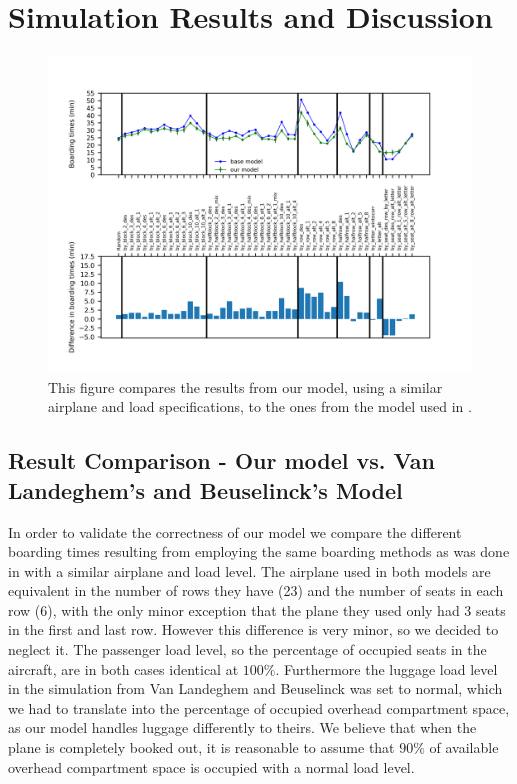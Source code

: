 \documentclass[11pt]{article}
\begin{document}
\section{Simulation Results and Discussion}
\begin{figure}
	\includegraphics[width=\linewidth]{../../code/AirplaneBoarding/data/figure1/figure1.png}
	\caption{This figure compares the results from our model, using a similar airplane and load specifications, to the ones from the model used in \cite{beus}.}
	\label{figure1}
\end{figure}
\subsection{Result Comparison - Our model vs. Van Landeghem's and Beuselinck's Model}
In order to validate the correctness of our model we compare the different boarding times resulting from employing the same boarding methods as was done in \cite{beus} with a similar airplane and load level. The airplane used in both models are equivalent in the number of rows they have (23) and the number of seats in each row (6), with the only minor exception that the plane they used only had 3 seats in the first and last row. However this difference is very minor, so we decided to neglect it. The passenger load level, so the percentage of occupied seats in the aircraft, are in both cases identical at $100\%$. Furthermore the luggage load level in the simulation from Van Landeghem and Beuselinck was set to normal, which we had to translate into the percentage of occupied overhead compartment space, as our model handles luggage differently to theirs. We believe that when the plane is completely booked out, it is reasonable to assume that $90\%$ of available overhead compartment space is occupied with a normal load level.
\end{document}
